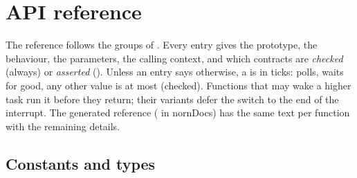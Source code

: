 \chapter{API reference}
\label{ch:api}

The reference follows the groups of . Every entry gives the
prototype, the behaviour, the parameters, the calling context, and which contracts are
\emph{checked} (always) or \emph{asserted} (). Unless an entry
says otherwise, a  is in ticks:  polls,
 waits for good, any other value is at most
 (checked). Functions that may wake a higher task run it before
they return; their  variants defer the switch to the end of the interrupt.
The generated reference ( in nornDocs) has the same text per function
with the remaining details.

\clearpage
\section{Constants and types}

